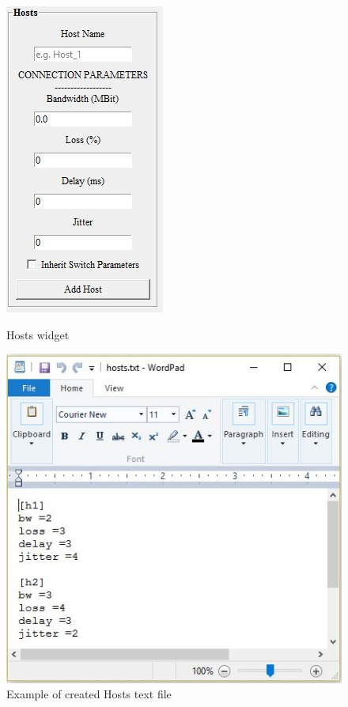 \begin{figure}[H]
\centering
\begin{minipage}{.5\textwidth}
  \centering
  \includegraphics[width=.4\linewidth]{Hosts}
  \caption{Hosts widget}
  \label{fig:test1}
\end{minipage}%
\begin{minipage}{.5\textwidth}
  \centering
  \includegraphics[width=.8\linewidth]{hosts_txt}
  \caption{Example of created Hosts text file}
  \label{fig:test2}
\end{minipage}
\end{figure}

